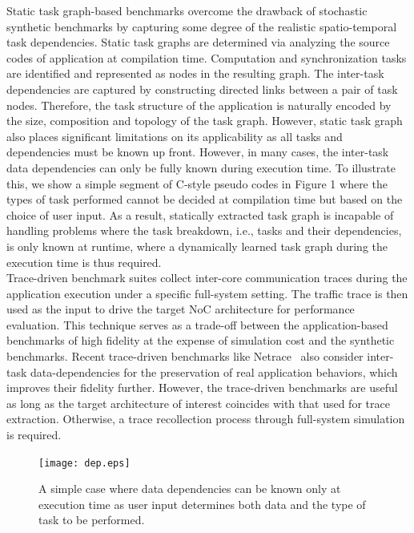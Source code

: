 \indent Static task graph-based benchmarks overcome the drawback of stochastic synthetic benchmarks by capturing some degree of the realistic spatio-temporal task dependencies. Static task graphs are determined via analyzing the source codes of application at compilation time. Computation and synchronization tasks are identified and represented as nodes in the resulting graph. The inter-task dependencies are captured by constructing directed links between a pair of task nodes. Therefore, the task structure of the application is naturally encoded by the size, composition and topology of the task graph. However, static task graph also places significant limitations on its applicability as all tasks and dependencies must be known up front. However, in many cases, the inter-task data dependencies can only be fully known during execution time. To illustrate this, we show a simple segment of C-style pseudo codes in Figure 1 where the types of task performed cannot be decided at compilation time but based on the choice of user input. As a result, statically extracted task graph is incapable of handling problems where the task breakdown, i.e., tasks and their dependencies, is only known at runtime, where a dynamically learned task graph during the execution time is thus required.\\
\indent Trace-driven benchmark suites collect inter-core communication traces during the application execution under a specific full-system setting. The traffic trace is then used as the input to drive the target NoC architecture for performance evaluation. This technique serves as a trade-off between the application-based benchmarks of high fidelity at the expense of simulation cost and the synthetic benchmarks. Recent trace-driven benchmarks like Netrace~\cite{hestness2010netrace} also consider inter-task data-dependencies for the preservation of real application behaviors, which improves their fidelity further. However, the trace-driven benchmarks are useful as long as the target architecture of interest coincides with that used for trace extraction. Otherwise, a trace recollection process through full-system simulation is required.\\
\begin{figure}%
  \centering
  \texttt{[image: dep.eps]}
  \vskip -3mm
  \caption{A simple case where data dependencies can be known only at execution time as user input determines both data and the type of task to be performed. }
  \label{fig:CODE}
  \vskip -6mm
\end{figure}
